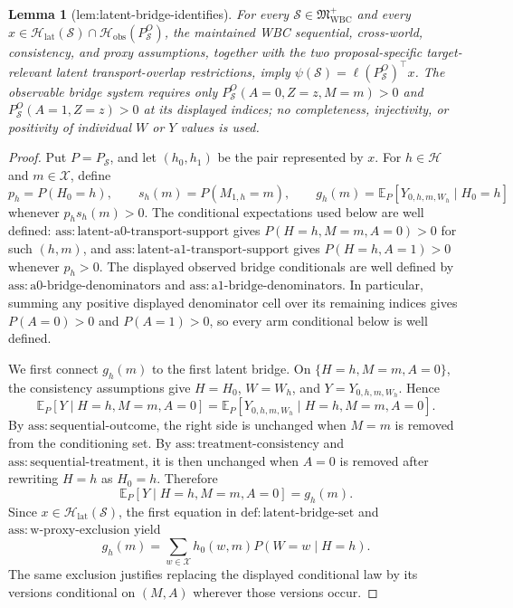 \documentclass{article}
\newtheorem{lemma}{Lemma}
\begin{document}
\begin{lemma}[lem:latent-bridge-identifies]\label{lem:latent-bridge-identifies}
For every \(\mathcal S\in\mathfrak M_{\mathrm{WBC}}^{+}\) and every \(x\in\mathcal H_{\mathrm{lat}}(\mathcal S)\cap\mathcal H_{\mathrm{obs}}(P_{\mathcal S}^O)\), the maintained WBC sequential, cross-world, consistency, and proxy assumptions, together with the two proposal-specific target-relevant latent transport-overlap restrictions, imply \(\psi(\mathcal S)=\ell(P_{\mathcal S}^O)^{\top}x\). The observable bridge system requires only \(P_{\mathcal S}^O(A=0,Z=z,M=m)>0\) and \(P_{\mathcal S}^O(A=1,Z=z)>0\) at its displayed indices; no completeness, injectivity, or positivity of individual \(W\) or \(Y\) values is used.
\end{lemma}
\begin{proof}
Put \(P=P_{\mathcal S}\), and let \((h_0,h_1)\) be the pair represented by
\(x\).  For \(h\in\mathcal H\) and \(m\in\mathcal X\), define
\[
 p_h=P(H_0=h),\qquad s_h(m)=P(M_{1,h}=m),\qquad
 g_h(m)=\mathbb E_P[Y_{0,h,m,W_h}\mid H_0=h]
\]
whenever \(p_hs_h(m)>0\).  The conditional expectations used below are well
defined: \(\mathrm{ass{:}latent\text{-}a0\text{-}transport\text{-}support}\)
gives \(P(H=h,M=m,A=0)>0\) for such \((h,m)\), and
\(\mathrm{ass{:}latent\text{-}a1\text{-}transport\text{-}support}\) gives
\(P(H=h,A=1)>0\) whenever \(p_h>0\).  The displayed observed bridge
conditionals are well defined by
\(\mathrm{ass{:}a0\text{-}bridge\text{-}denominators}\) and
\(\mathrm{ass{:}a1\text{-}bridge\text{-}denominators}\).
In particular, summing any positive displayed denominator cell over its remaining
indices gives \(P(A=0)>0\) and \(P(A=1)>0\), so every arm conditional below is
well defined.

We first connect \(g_h(m)\) to the first latent bridge.  On
\(\{H=h,M=m,A=0\}\), the consistency assumptions give
\(H=H_0\), \(W=W_h\), and \(Y=Y_{0,h,m,W_h}\).  Hence
\[
 \mathbb E_P[Y\mid H=h,M=m,A=0]
 =\mathbb E_P[Y_{0,h,m,W_h}\mid H=h,M=m,A=0].
\]
By \(\mathrm{ass{:}sequential\text{-}outcome}\), the right side is unchanged
when \(M=m\) is removed from the conditioning set.  By
\(\mathrm{ass{:}treatment\text{-}consistency}\) and
\(\mathrm{ass{:}sequential\text{-}treatment}\), it is then unchanged when
\(A=0\) is removed after rewriting \(H=h\) as \(H_0=h\).  Therefore
\[
 \mathbb E_P[Y\mid H=h,M=m,A=0]=g_h(m).
\]
Since \(x\in\mathcal H_{\mathrm{lat}}(\mathcal S)\), the first equation in
\(\mathrm{def{:}latent\text{-}bridge\text{-}set}\) and
\(\mathrm{ass{:}w\text{-}proxy\text{-}exclusion}\) yield
\[
 g_h(m)=\sum_{w\in\mathcal X}h_0(w,m)P(W=w\mid H=h).
 \tag{1}
\]
The same exclusion justifies replacing the displayed conditional law by its
versions conditional on \((M,A)\) wherever those versions occur.


\end{proof}
\end{document}
